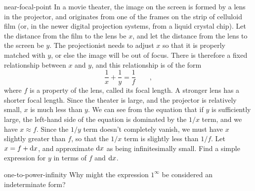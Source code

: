 \begin{hwsection}
%

%
\begin{hwwithsoln}{near-focal-point}
In a movie theater, the image on the screen is formed by a lens in the projector, and originates from one of the frames on the strip of celluloid film (or,
in the newer digital projection systems, from a liquid crystal chip).
Let the distance from the film to the lens be $x$, and let the distance from the lens to the screen be $y$. The projectionist
needs to adjust $x$ so that it is properly matched with $y$, or else the image will be out of focus. There is therefore
a fixed relationship between $x$ and $y$, and this relationship is of the form
\begin{equation*}
  \frac{1}{x}+\frac{1}{y} = \frac{1}{f} \qquad ,
\end{equation*}
where $f$ is a property of the lens, called its focal length. A stronger lens has a shorter focal length.
Since the theater is large, and the projector is relatively small, $x$ is much less than $y$.
We can see from the equation that if $y$ is sufficiently large, the left-hand side of the equation
is dominated by the $1/x$ term, and we have $x \approx f$. Since the $1/y$ term doesn't completely
vanish, we must have $x$ slightly greater than $f$, so that the $1/x$ term is slightly less than
$1/f$. Let $x=f+\operatorname{d\!} x$, and approximate $\operatorname{d\!} x$ as being infinitesimally small.
Find a simple expression for $y$ in terms of $f$ and $\operatorname{d\!} x$.
\end{hwwithsoln}

\begin{hwwithsoln}{one-to-power-infinity}
Why might the expression $1^\infty$ be considered an indeterminate form?
\end{hwwithsoln}

\end{hwsection}
